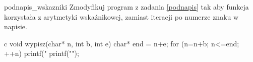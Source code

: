 \begin{Zadanie}{}{podnapis_wskazniki}
Zmodyfikuj program z zadania \ref{podnapis} tak aby funkcja korzystała z arytmetyki wskaźnikowej, zamiast iteracji po numerze znaku w napisie.

\begin{rozwiazanie}{c}
void wypisz(char* n, int b, int e) {
	char* end = n+e;
	for (n=n+b; n<=end; ++n)
		printf("%
	printf("\n");
}
\end{rozwiazanie}
\end{Zadanie}
